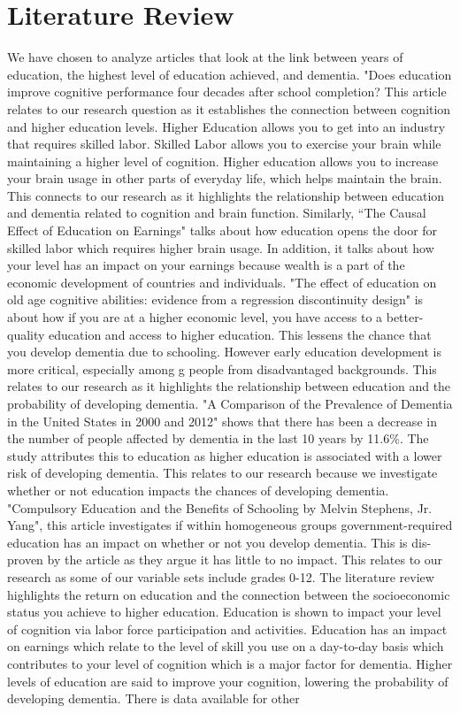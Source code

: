 \documentclass{article}
\begin{document}
\section{Literature Review} \label{sec:literature}

\hspace*{1em} We have chosen to analyze articles that look at the link between years of education, the highest level of education achieved, and dementia. "Does education improve cognitive performance four decades after school completion? This article relates to our research question as it establishes the connection between cognition and higher education levels. Higher Education allows you to get into an industry that requires skilled labor. Skilled Labor allows you to exercise your brain while maintaining a higher level of cognition. Higher education allows you to increase your brain usage in other parts of everyday life, which helps maintain the brain. This connects to our research as it highlights the relationship between education and dementia related to cognition and brain function. Similarly, “The Causal Effect of Education on Earnings" talks about how education opens the door for skilled labor which requires higher brain usage. In addition, it talks about how your level has an impact on your earnings because wealth is a part of the economic development of countries and individuals. "The effect of education on old age cognitive abilities: evidence from a regression discontinuity design" is about how if you are at a higher economic level, you have access to a better-quality education and access to higher education. This lessens the chance that you develop dementia due to schooling. However early education development is more critical, especially among g people from disadvantaged backgrounds. This relates to our research as it highlights the relationship between education and the probability of developing dementia. "A Comparison of the Prevalence of Dementia in the United States in 2000 and 2012" shows that there has been a decrease in the number of people affected by dementia in the last 10 years by 11.6\%. The study attributes this to education as higher education is associated with a lower risk of developing dementia. This relates to our research because we investigate whether or not education impacts the chances of developing dementia. "Compulsory Education and the Benefits of Schooling by Melvin Stephens, Jr. Yang", this article investigates if within homogeneous groups government-required education has an impact on whether or not you develop dementia. This is dis-proven by the article as they argue it has little to no impact. This relates to our research as some of our variable sets include grades 0-12. The literature review highlights the return on education and the connection between the socioeconomic status you achieve to higher education. Education is shown to impact your level of cognition via labor force participation and activities. Education has an impact on earnings which relate to the level of skill you use on a day-to-day basis which contributes to your level of cognition which is a major factor for dementia. Higher levels of education are said to improve your cognition, lowering the probability of developing dementia. There is data available for other 
\end{document}

